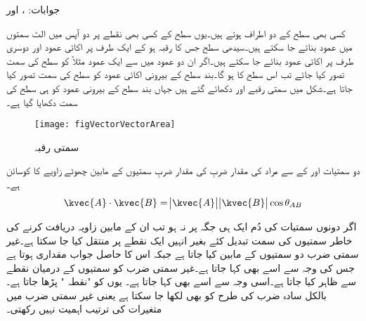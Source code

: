 جوابات: ،  اور 



کسی بھی سطح کے دو اطراف ہوتے ہیں۔یوں سطح کے کسی بھی نقطے پر دو آپس میں الٹ سمتوں میں عمود بنائے جا سکتے ہیں۔سیدھی سطح جس کا رقبہ  ہو کے ایک طرف پر اکائی عمود  اور دوسری طرف پر اکائی عمود  بنائے جا سکتے ہیں۔اگر ان دو عمود میں سے ایک عمود مثلاً  کو سطح کی سمت تصور کیا جائے تب اس سطح کا   ہو گا۔بند سطح کے  بیرونی اکائی عمود کو سطح کی سمت تصور کیا جاتا ہے۔شکل  میں سمتی رقبے  اور  دکھائے گئے ہیں جہاں بند سطح کے بیرونی عمود کو ہی سطح کی سمت دکھایا گیا ہے۔
\begin{figure}
\centering
\texttt{[image: figVectorVectorArea]}
\caption{سمتی رقبہ}
\label{شکل_سمتیہ_سمتی_رقبہ}
\end{figure}


دو سمتیات  اور  کے  سے مراد  کی مقدار ضربِ   کی مقدار ضربِ سمتیوں کے مابین چھوٹے زاویے کا کوسائن ہے۔
\begin{align}\label{مساوات_سمتیہ_مقداری_ضرب}
\kvec{A} \cdot \kvec{B}=\abs{\kvec{A}} \abs{\kvec{B}} \cos \theta_{AB}
\end{align}

اگر دونوں سمتیات کی دُم ایک ہی جگہ پر نہ ہو تب ان کے مابین زاویہ دریافت کرنے کی  خاطر سمتیوں کی سمت تبدیل کئے بغیر انہیں ایک نقطے پر منتقل کیا جا سکتا ہے۔غیر سمتی ضرب دو سمتیوں کے مابین کیا جاتا ہے جبکہ اس کا حاصل جواب مقداری ہوتا ہے جس کی وجہ سے اسے   بھی کہا جاتا ہے۔غیر سمتی ضرب کو سمتیوں کے درمیان نقطے سے ظاہر کیا جاتا ہے۔اسی وجہ سے اسے  بھی کہا جاتا ہے۔ یوں  کو "نقطہ " پڑھا جاتا ہے۔بالکل سادہ ضرب کی طرح  کو  بھی لکھا جا سکتا ہے یعنی غیر سمتی ضرب میں متغیرات کی ترتیب اہمیت نہیں رکھتی۔

